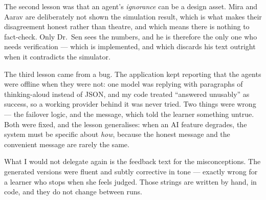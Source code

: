 \documentclass[11pt,a4paper]{article}
\begin{document}
The second lesson was that an agent's \emph{ignorance} can be a design asset. Mira and Aarav are
deliberately not shown the simulation result, which is what makes their disagreement honest
rather than theatre, and which means there is nothing to fact-check. Only Dr.\ Sen sees the
numbers, and he is therefore the only one who needs verification --- which is implemented, and
which discards his text outright when it contradicts the simulator.

The third lesson came from a bug. The application kept reporting that the agents were offline
when they were not: one model was replying with paragraphs of thinking-aloud instead of JSON, and
my code treated ``answered unusably'' as success, so a working provider behind it was never
tried. Two things were wrong --- the failover logic, and the message, which told the learner
something untrue. Both were fixed, and the lesson generalises: when an AI feature degrades, the
system must be specific about \emph{how}, because the honest message and the convenient message
are rarely the same.

What I would not delegate again is the feedback text for the misconceptions. The generated
versions were fluent and subtly corrective in tone --- exactly wrong for a learner who stops when
she feels judged. Those strings are written by hand, in code, and they do not change between runs.
\end{document}

